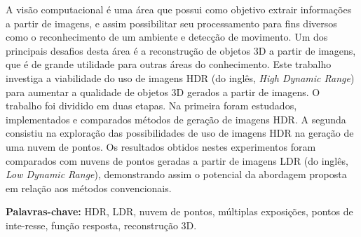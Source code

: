 A visão computacional é uma área que possui como objetivo extrair informações a partir de imagens, e assim possibilitar seu processamento para fins diversos como o reconhecimento de um ambiente e detecção de movimento. Um dos principais desafios desta área é a reconstrução de objetos 3D a partir de imagens, que é de grande utilidade para outras áreas do conhecimento. Este trabalho investiga a viabilidade do uso de imagens HDR (do inglês, \textit{High Dynamic Range}) para aumentar a qualidade de objetos 3D gerados a partir de imagens. O trabalho foi dividido em duas etapas. Na primeira foram estudados, implementados e comparados métodos de geração de imagens HDR. A segunda consistiu na exploração das possibilidades de uso de imagens HDR na geração de uma nuvem de pontos. Os resultados obtidos nestes experimentos foram comparados com nuvens de pontos geradas a partir de imagens LDR (do inglês, \textit{Low Dynamic Range}), demonstrando assim o potencial da abordagem proposta em relação aos métodos convencionais.

\textbf{Palavras-chave:} HDR, LDR, nuvem de pontos, múltiplas exposições, pontos de inte-resse, função resposta, reconstrução 3D. 